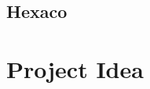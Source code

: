 \documentclass{article}
\begin{document}
\subsection{Hexaco}



\section{Project Idea}
\end{document}
